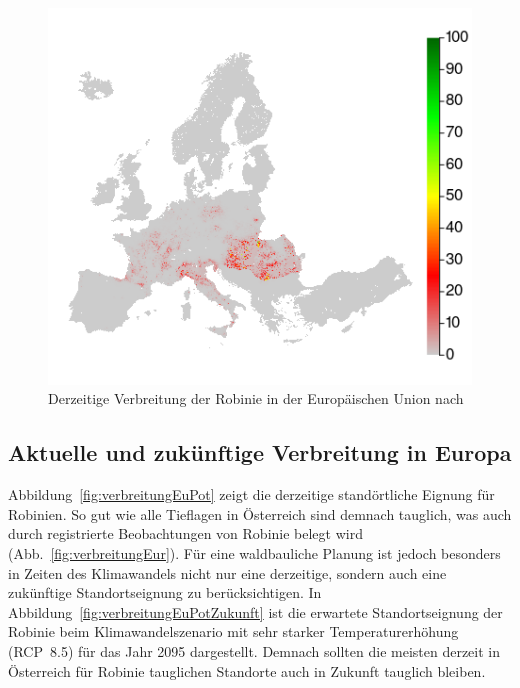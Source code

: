 \documentclass[twocolumn]{scrartcl}
\begin{document}
\begin{figure}[htbp]
  \centering
  \includegraphics[width=.9\linewidth]{./bild/verbreitungEuropa}
  \caption{Derzeitige Verbreitung der Robinie in der Europäischen Union nach \citet{jrc2016treeAtlas}}
  \label{fig:verbreitungEuJetzt}
\end{figure}

\subsection{Aktuelle und zukünftige Verbreitung in Europa}

Abbildung~\ref{fig:verbreitungEuPot} zeigt die derzeitige standörtliche Eignung für Robinien. So gut wie alle Tieflagen in Österreich sind demnach tauglich, was auch durch registrierte Beobachtungen von Robinie belegt wird (Abb.~\ref{fig:verbreitungEur}). Für eine waldbauliche Planung ist jedoch besonders in Zeiten des Klimawandels nicht nur eine derzeitige, sondern auch eine zukünftige Standortseignung zu berücksichtigen. In Abbildung~\ref{fig:verbreitungEuPotZukunft} ist die erwartete Standortseignung der Robinie beim Klimawandelszenario mit sehr starker Temperaturerhöhung (RCP~8.5) für das Jahr 2095 dargestellt. Demnach sollten die meisten derzeit in Österreich für Robinie tauglichen Standorte auch in Zukunft tauglich bleiben.
\end{document}
